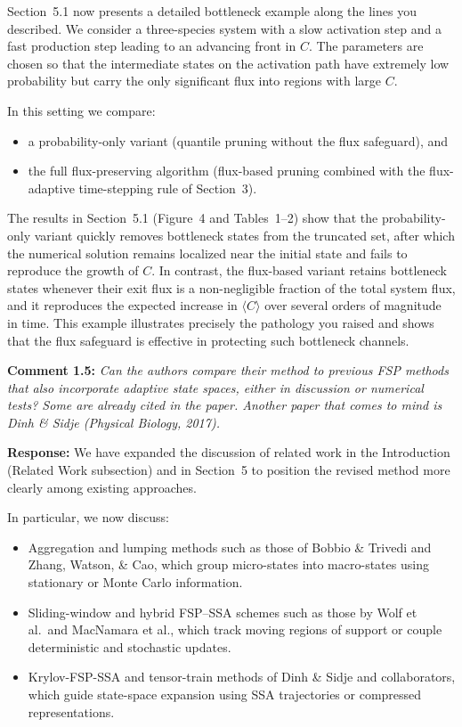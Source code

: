 \documentclass[11pt]{article}
\begin{document}
Section~5.1 now presents a detailed bottleneck example along the lines you
described. We consider a three-species system with a slow activation step and a
fast production step leading to an advancing front in $C$. The parameters are
chosen so that the intermediate states on the activation path have extremely low
probability but carry the only significant flux into regions with large $C$.

In this setting we compare:
\begin{itemize}
  \item a probability-only variant (quantile pruning without the flux safeguard), and
  \item the full flux-preserving algorithm (flux-based pruning combined with the
        flux-adaptive time-stepping rule of Section~3).
\end{itemize}

The results in Section~5.1 (Figure~4 and Tables~1--2) show that the
probability-only variant quickly removes bottleneck states from the truncated set,
after which the numerical solution remains localized near the initial state and
fails to reproduce the growth of $C$. In contrast, the flux-based variant
retains bottleneck states whenever their exit flux is a non-negligible fraction
of the total system flux, and it reproduces the expected increase in
$\langle C\rangle$ over several orders of magnitude in time. This example
illustrates precisely the pathology you raised and shows that the flux safeguard
is effective in protecting such bottleneck channels.

\medskip

\noindent\textbf{Comment 1.5:} \textit{Can the authors compare their method to previous FSP methods that
also incorporate adaptive state spaces, either in discussion or numerical tests?
Some are already cited in the paper. Another paper that comes to mind is Dinh \&
Sidje (Physical Biology, 2017).}

\textbf{Response:} We have expanded the discussion of related work in the Introduction
(Related Work subsection) and in Section~5 to position the revised method more
clearly among existing approaches.

In particular, we now discuss:
\begin{itemize}
  \item Aggregation and lumping methods such as those of Bobbio \& Trivedi and
        Zhang, Watson, \& Cao, which group micro-states into macro-states using
        stationary or Monte Carlo information.
  \item Sliding-window and hybrid FSP--SSA schemes such as those by Wolf
        et al.\ and MacNamara et al., which track moving regions of support or
        couple deterministic and stochastic updates.
  \item Krylov-FSP-SSA and tensor-train methods of Dinh \& Sidje and
        collaborators, which guide state-space expansion using SSA trajectories or
        compressed representations.
\end{itemize}
\end{document}
